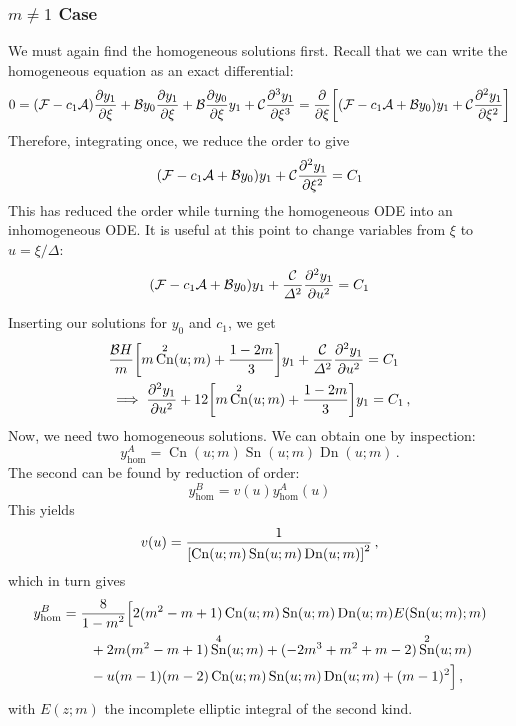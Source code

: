 \documentclass{jfm}
\let\Oldsubsubsection\subsubsection
\renewcommand{\subsubsection}{\FloatBarrier\Oldsubsubsection}
\DeclareMathOperator{\cn}{Cn}
\DeclareMathOperator{\sn}{Sn}
\DeclareMathOperator{\dn}{Dn}
\begin{document}
\subsubsection{\texorpdfstring{$m \neq 1$}{Cnoidal Wave} Case}
We must again find the homogeneous solutions first.
Recall that we can write the homogeneous equation as an exact
differential:
\begin{equation}
  0 = \pqty{\mathcal{F} -c_1 \mathcal{A}} \pdv{y_1}{\xi}
    + \mathcal{B} y_0 \pdv{y_1}{\xi}
    + \mathcal{B} \pdv{y_0}{\xi} y_1
    + \mathcal{C} \pdv[3]{y_1}{\xi}
  = \pdv{\xi} \bqty{
    \pqty{\mathcal{F} -c_1 \mathcal{A} + \mathcal{B} y_0} y_1
    + \mathcal{C} \pdv[2]{y_1}{\xi}
    }
\end{equation}
Therefore, integrating once, we reduce the order to give
\begin{equation}
    \pqty{\mathcal{F} -c_1 \mathcal{A} + \mathcal{B} y_0} y_1
    + \mathcal{C} \pdv[2]{y_1}{\xi}
    = C_1
\end{equation}
This has reduced the order while turning the homogeneous ODE into an
inhomogeneous ODE.
It is useful at this point to change variables from $\xi$ to $u =
\xi/\Delta$:
\begin{equation}
    \pqty{\mathcal{F} -c_1 \mathcal{A} + \mathcal{B} y_0} y_1
    + \frac{\mathcal{C}}{\Delta^2} \pdv[2]{y_1}{u}
    = C_1
\end{equation}

Inserting our solutions for $y_0$ and $c_1$, we get
\begin{align}
  &\frac{\mathcal{B}H}{m} \bqty{m \cn^2 (u;m) + \frac{1-2m}{3}} y_1
    + \frac{\mathcal{C}}{\Delta^2} \pdv[2]{y_1}{u} = C_1
    \\&
  \implies
  \pdv[2]{y_1}{u} + 12 \bqty{m\cn^2 (u;m) + \frac{1-2m}{3}} y_1 = C_1 \,,
  \label{eq:exact_cnoidal}
\end{align}
Now, we need two homogeneous solutions.
We can obtain one by inspection:
\begin{equation}
  y^{A}_{\text{hom}} = \cn(u; m) \sn(u; m) \dn(u; m) \,.
\end{equation}
The second can be found by reduction of order:
\begin{equation}
  y^B_{\text{hom}} = v(u) y^A_{\text{hom}}(u)
\end{equation}
This yields
\begin{equation}
  v(u) = \frac{1}{\bqty{\cn(u; m) \sn(u; m) \dn(u; m)}^2} \,,
\end{equation}
which in turn gives
\begin{equation}
  \begin{split}
    y^B_{\text{hom}}
    &= \frac{8}{{1-m}^2} \Bigl[
      2(m^2 -m +1) \cn(u;m) \sn(u;m) \dn(u;m) E(\sn(u;m);m)
      \\
    &\qquad
      + 2m(m^2-m+1) \sn^4(u;m) + (-2m^3+m^2+m-2) \sn^2(u;m) \\
    &\qquad
      - u(m-1)(m-2) \cn(u;m) \sn(u;m) \dn(u;m) + (m-1)^2 \Bigr] \,,
  \end{split}
\end{equation}
with $E(z;m)$ the incomplete elliptic integral of the second kind.
\end{document}
